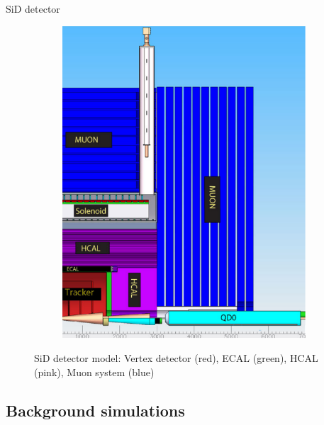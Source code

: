 \documentclass[xcolor={dvipsnames}]{beamer}
\begin{document}
\begin{frame}{SiD detector}
{\begin{figure}[T]
\begin{subfigure}[b]{0.49\textwidth}
\includegraphics[height=0.65\textheight]{figures/SiD_detector_model_Ausschnitt.pdf}
\end{subfigure}
\caption{\small SiD detector model: Vertex detector (red), ECAL (green), HCAL (pink), Muon system (blue)}
\end{figure}
}
\end{frame}

\subsection{Background simulations}
\end{document}
